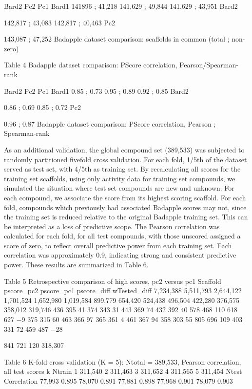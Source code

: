 Bard2
Pc2
Pc1
Bard1
141896 ; 41,218
141,629 ; 49,844
141,629 ; 43,951
Bard2


142,817 ; 43,083
142,817 ; 40,463
Pc2




143,087 ; 47,252
Badapple dataset comparison: scaffolds in common (total ; non-zero)


Table 4 Badapple dataset comparison: PScore correlation, Pearson/Spearman-rank


Bard2
Pc2
Pc1
Bard1
0.85 ; 0.73
0.95 ; 0.89
0.92 ; 0.85
Bard2


0.86 ; 0.69
0.85 ; 0.72
Pc2




0.96 ; 0.87
Badapple dataset comparison: PScore correlation, Pearson ; Spearman-rank

As an additional validation, the global compound set (389,533) was subjected to randomly partitioned fivefold cross validation. For each fold, 1/5th of the dataset served as test set, with 4/5th as training set. By recalculating all scores for the training set scaffolds, using only activity data for training set compounds, we simulated the situation where test set compounds are new and unknown. For each compound, we associate the score from its highest scoring scaffold. For each fold, compounds which previously had associated Badapple scores may not, since the training set is reduced relative to the original Badapple training set. This can be interpreted as a loss of predictive scope. The Pearson correlation was calculated for each fold, for all test compounds, with those unscored assigned a score of zero, to reflect overall predictive power from each training set. Each correlation was approximately 0.9, indicating strong and consistent predictive power. These results are summarized in Table 6.

Table 5 Retrospective comparison of high scores, pc2 versus pc1
Scaffold pscore\_pc2
pscore\_pc1 pscore\_diff
wTested\_diff
7,234,388
5,511,793
2,644,122
1,701,524
1,652,980
1,019,584
899,779
654,420
524,438
496,504
422,280
376,575
358,012
319,746
     436 395 41
374 343 31
443 369 74
432 392 40
578 468 110
618 627 −9 375 315 60 463 366 97
365 361 4
461 367 94
358 303 55
805 696 109
403 331 72
459 487 −28

841 721 120
318,307             

Table 6 K-fold cross validation (K = 5): Ntotal = 389,533, Pearson correlation, all test scores
k Ntrain
1 311,540 2 311,463 3 311,652 4 311,565 5 311,454
Ntest Correlation
77,993 0.895 78,070 0.891 77,881 0.898 77,968 0.901 78,079 0.903



